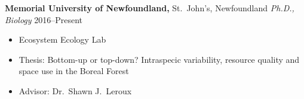 
\vspace{7pt}

\textbf{Memorial University of Newfoundland,} St.\ John's, Newfoundland \newline
\emph{Ph.D., Biology}
\hfill{2016--Present}
\begin{itemize}
  \item Ecosystem Ecology Lab
  \item Thesis: Bottom-up or top-down? Intraspecic variability, resource quality and space use in the Boreal Forest
  \item Advisor: Dr.~Shawn J.~Leroux
\end{itemize}
